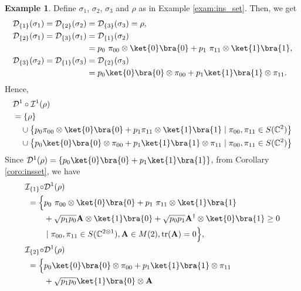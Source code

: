 \documentclass[reprint,amsmath,amssymb,aps,]{revtex4-2}
\theoremstyle{definition}
\newtheorem{exam}{Example}
\newcommand{\SET}[1]{\mathbb{#1}}
\newcommand{\C}{\SET{C}}
\newcommand{\1}{\mbox{1}\hspace{-0.25em}\mbox{l}}%
\newcommand{\mat}[1]{\mathbf{#1}}
\newcommand{\pure}[2]{\C^{#1 \otimes #2}}
\newcommand{\state}[2]{S(\pure{#1}{#2})}
\newcommand{\QU}[1]{\mathcal{#1}}
\begin{document}
\begin{exam}
  \label{exam:swap_TinsTdel}
  Define $\sigma_1$, $\sigma_2$, $\sigma_3$ and $\rho$ as in
  Example \ref{exam:ins_set}.
  Then,
  we get
  \begin{align*}
    \QU{D}_{\{1\}}(\sigma_1)
    =
    \QU{D}_{\{2\}}(\sigma_2)
    &=
    \QU{D}_{\{3\}}(\sigma_3)
    =
    \rho,\\
    \QU{D}_{\{2\}}(\sigma_1)
    =
    \QU{D}_{\{3\}}(\sigma_1)
    &=
    \QU{D}_{\{1\}}(\sigma_2)\\
    &=
    p_0 ~ \pi_{00} \otimes \ket{0}\bra{0}
    +
    p_1 ~ \pi_{11} \otimes \ket{1}\bra{1},\\
    \QU{D}_{\{3\}}(\sigma_2)
    =
    \QU{D}_{\{1\}}(\sigma_3)
    &=
    \QU{D}_{\{2\}}(\sigma_3)\\
    &=
    p_0 \ket{0}\bra{0} \otimes \pi_{00}
    +
    p_1 \ket{1}\bra{1} \otimes \pi_{11}.
  \end{align*}
  Hence,
  \begin{align*}
    &\QU{D}^1 \circ \QU{I}^1(\rho)\\
    &=
    \{ \rho \}\\
    &~~~\cup
    \left\{
    p_0 \pi_{00} \otimes \ket{0}\bra{0}
    +
    p_1 \pi_{11} \otimes \ket{1}\bra{1}
    \mid
    \pi_{00}, \pi_{11} \in S(\C^2)
    \right\}\\
    &~~~\cup
    \left\{
    p_0 \ket{0}\bra{0} \otimes \pi_{00}
    +
    p_1 \ket{1}\bra{1} \otimes \pi_{11}
    \mid
    \pi_{00}, \pi_{11} \in S(\C^2)
    \right\}
  \end{align*}
  Since
  $\QU{D}^1(\rho) = \{ p_0 \ket{0}\bra{0} + p_1 \ket{1}\bra{1} \}$,
  from Corollary \ref{coro:insset},
  we have
  \begin{align*}
    \QU{I}_{\{1\}} \circ &\QU{D}^1(\rho)\\
    =
    \Big\{
    &p_0 ~ \pi_{00} \otimes \ket{0}\bra{0}
    +p_1 ~ \pi_{11} \otimes \ket{1}\bra{1}\\
    &+ \sqrt{p_1p_0} \mat{A} \otimes \ket{1}\bra{0}
    + \sqrt{p_0p_1} \mat{A}^\dagger \otimes \ket{0}\bra{1} \ge 0\\
    &\mid
    \pi_{00}, \pi_{11} \in \state{2}{1},
    \mat{A} \in M(2),
    \text{tr}(\mat{A}) = 0
    \Big\},\\
    \QU{I}_{\{2\}} \circ &\QU{D}^1(\rho)\\
    =
    \Big\{
    &p_0 \ket{0}\bra{0} \otimes \pi_{00}
    +p_1 \ket{1}\bra{1} \otimes \pi_{11}\\
    &+ \sqrt{p_1p_0} \ket{1}\bra{0} \otimes \mat{A}

\end{align*}
\end{exam}
\end{document}
